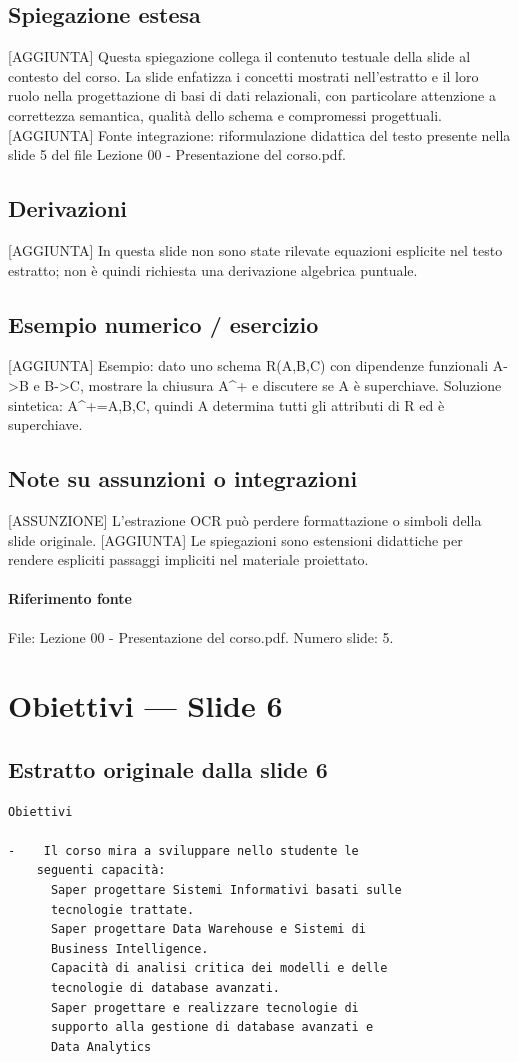 \documentclass[11pt]{article}
\begin{document}
\subsection*{Spiegazione estesa}
[AGGIUNTA] Questa spiegazione collega il contenuto testuale della slide al contesto del corso. La slide enfatizza i concetti mostrati nell'estratto e il loro ruolo nella progettazione di basi di dati relazionali, con particolare attenzione a correttezza semantica, qualità dello schema e compromessi progettuali.
[AGGIUNTA] Fonte integrazione: riformulazione didattica del testo presente nella slide 5 del file Lezione 00 - Presentazione del corso.pdf.
\subsection*{Derivazioni}
[AGGIUNTA] In questa slide non sono state rilevate equazioni esplicite nel testo estratto; non è quindi richiesta una derivazione algebrica puntuale.
\subsection*{Esempio numerico / esercizio}
[AGGIUNTA] Esempio: dato uno schema R(A,B,C) con dipendenze funzionali A->B e B->C, mostrare la chiusura A^+ e discutere se A è superchiave. Soluzione sintetica: A^+={A,B,C}, quindi A determina tutti gli attributi di R ed è superchiave.
\subsection*{Note su assunzioni o integrazioni}
[ASSUNZIONE] L'estrazione OCR può perdere formattazione o simboli della slide originale.
[AGGIUNTA] Le spiegazioni sono estensioni didattiche per rendere espliciti passaggi impliciti nel materiale proiettato.
\paragraph{Riferimento fonte} File: Lezione 00 - Presentazione del corso.pdf. Numero slide: 5.
\section{Obiettivi --- Slide 6}
\subsection*{Estratto originale dalla slide 6}
\begin{lstlisting}
Obiettivi

-    Il corso mira a sviluppare nello studente le
    seguenti capacità:
      Saper progettare Sistemi Informativi basati sulle
      tecnologie trattate.
      Saper progettare Data Warehouse e Sistemi di
      Business Intelligence.
      Capacità di analisi critica dei modelli e delle
      tecnologie di database avanzati.
      Saper progettare e realizzare tecnologie di
      supporto alla gestione di database avanzati e
      Data Analytics
\end{lstlisting}
\end{document}
